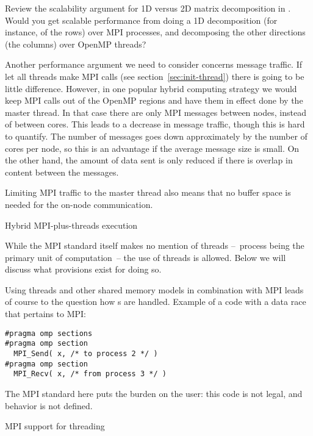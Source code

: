\begin{exercise}
  Review the scalability argument for 1D versus 2D matrix
  decomposition in . Would you get
  scalable performance from doing a 1D decomposition (for instance, of
  the rows) over MPI processes, and decomposing the other directions
  (the columns) over OpenMP threads?
\end{exercise}

Another performance argument we need to consider concerns message
traffic.  If let all threads make MPI calls (see
section~\ref{sec:init-thread}) there is going to be little
difference. However, in one popular hybrid computing strategy we would
keep MPI calls out of the OpenMP regions and have them in effect done
by the master thread.
%
In that case there are only MPI messages
between nodes, instead of between cores. This leads to a decrease in
message traffic, though this is hard to quantify. The number of
messages goes down approximately by the number of cores per node, so
this is an advantage if the average message size is small. On the
other hand, the amount of data sent is only reduced if there is
overlap in content between the messages.

Limiting MPI traffic to the master thread also means that no buffer
space is needed for the on-node communication.

 {Hybrid MPI-plus-threads execution}
\label{sec:init-thread}
\label{sec:ref:mpi-thread}

While the MPI standard itself makes no mention of threads
--~process being the primary unit of computation~--
the use of threads is allowed.
Below we will discuss what provisions exist for doing so.

Using threads and other shared memory models in combination with MPI
leads of course to the question how
s are handled.
Example of a code with a data race that pertains to MPI:
\begin{lstlisting}
#pragma omp sections
#pragma omp section
  MPI_Send( x, /* to process 2 */ )
#pragma omp section
  MPI_Recv( x, /* from process 3 */ )
\end{lstlisting}
The MPI standard here puts the burden on the user:
this code is not legal, and behavior is not defined.

 {MPI support for threading}

